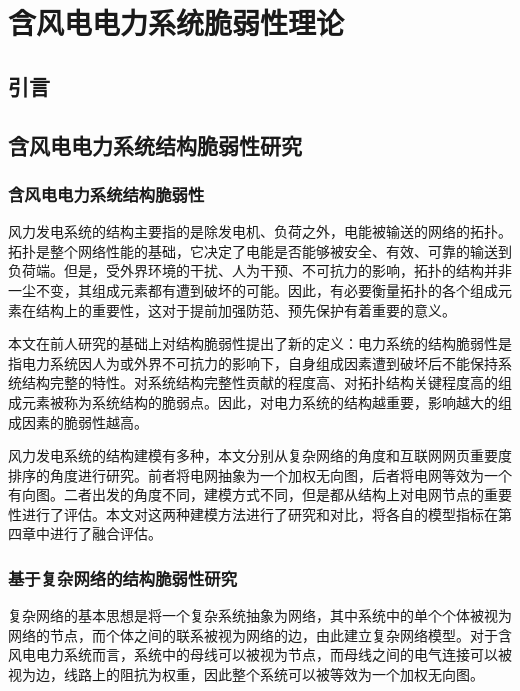 \chapter{含风电电力系统脆弱性理论}
\label{cha:theory}

\section{引言}
\label{sec:index3}


\section{含风电电力系统结构脆弱性研究}
\label{sec:powersys}

\subsection{含风电电力系统结构脆弱性}
\label{sec:vulneStuct}
风力发电系统的结构主要指的是除发电机、负荷之外，电能被输送的网络的拓扑。拓扑是整个网络性能的基础，它决定了电能是否能够被安全、有效、可靠的输送到负荷端。但是，受外界环境的干扰、人为干预、不可抗力的影响，拓扑的结构并非一尘不变，其组成元素都有遭到破坏的可能。因此，有必要衡量拓扑的各个组成元素在结构上的重要性，这对于提前加强防范、预先保护有着重要的意义。

本文在前人研究的基础上对结构脆弱性提出了新的定义：电力系统的结构脆弱性是指电力系统因人为或外界不可抗力的影响下，自身组成因素遭到破坏后不能保持系统结构完整的特性。对系统结构完整性贡献的程度高、对拓扑结构关键程度高的组成元素被称为系统结构的脆弱点。因此，对电力系统的结构越重要，影响越大的组成因素的脆弱性越高。

风力发电系统的结构建模有多种，本文分别从复杂网络的角度和互联网网页重要度排序的角度进行研究。前者将电网抽象为一个加权无向图，后者将电网等效为一个有向图。二者出发的角度不同，建模方式不同，但是都从结构上对电网节点的重要性进行了评估。本文对这两种建模方法进行了研究和对比，将各自的模型指标在第四章中进行了融合评估。

\subsection{基于复杂网络的结构脆弱性研究}
\label{sec:network}
复杂网络的基本思想是将一个复杂系统抽象为网络，其中系统中的单个个体被视为网络的节点，而个体之间的联系被视为网络的边，由此建立复杂网络模型。对于含风电电力系统而言，系统中的母线可以被视为节点，而母线之间的电气连接可以被视为边，线路上的阻抗为权重，因此整个系统可以被等效为一个加权无向图。

